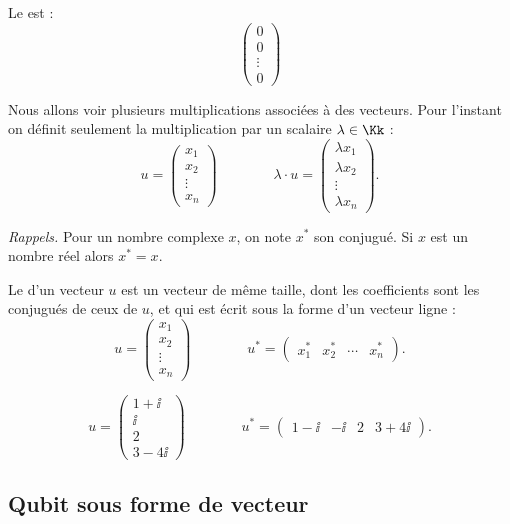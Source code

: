 \documentclass[11pt,class=report,crop=false]{standalone}
\begin{document}
Le  est :
$$\begin{pmatrix}0\\0\\\vdots\\0\end{pmatrix}$$

Nous allons voir plusieurs multiplications associées à des vecteurs.
Pour l'instant on définit seulement la multiplication par un scalaire $\lambda\in\Kk$ :
$$u = \begin{pmatrix}x_1\\x_2\\\vdots\\x_n\end{pmatrix}
\qquad\qquad
\lambda \cdot u = \begin{pmatrix}\lambda x_1 \\ \lambda x_2 \\\vdots \\\lambda x_n\end{pmatrix}.$$ 


\emph{Rappels.} 
Pour un nombre complexe $x$, on note $x^*$ son conjugué. Si $x$ est un nombre réel alors $x^* = x$.

Le  d'un vecteur $u$ est un vecteur de même taille, dont les coefficients sont les conjugués de ceux de $u$, et qui est écrit sous la forme d'un vecteur ligne :
$$u = \begin{pmatrix}x_1\\x_2\\\vdots\\x_n\end{pmatrix}
\qquad\qquad
u^* = \begin{pmatrix}x_1^*& x_2^*& \cdots &x_n^*\end{pmatrix}.$$


\begin{exemple}
$$u = \begin{pmatrix}1+\ii\\\ii\\2\\3-4\ii\end{pmatrix}
\qquad\qquad
u^* = \begin{pmatrix}1-\ii&-\ii&2&3+4\ii\end{pmatrix}.$$
\end{exemple}

\subsection{Qubit sous forme de vecteur}
\end{document}
